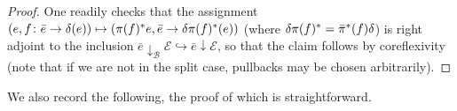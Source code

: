 \documentclass[a4paper,10pt
,draft
]{article}%
\numberwithin{equation}{section}
\numberwithin{figure}{section}
\theoremstyle{definition} %
\newcommand{\1}{\ensuremath{\mathbbm 1}}%
\begin{document}
\begin{proof}
One readily checks that the assignment
$
	(e,f\colon\bar{e} \to \delta(e))
\mapsto
	\left(
	\pi(f)^{\**}e, \bar{e} \to \delta \pi(f)^{\**}(e)
	\right)
$
(where $\delta \pi(f)^{\**} = \bar{\pi}^{\**}(f) \delta$) is  right adjoint to the inclusion
$\bar{e} \downarrow_{\mathcal{B}} \mathcal{E} \hookrightarrow
\bar{e} \downarrow \mathcal{E}$, so that the claim follows by coreflexivity 
(note that if we are not in the split case, pullbacks may be chosen arbitrarily).
\end{proof}




We also record the following, the proof of which is straightforward.
\end{document}

